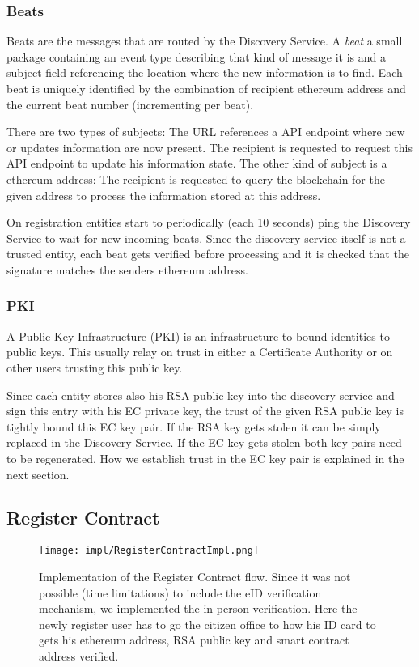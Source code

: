 \subsubsection{Beats}
\label{sec:beats}
Beats are the messages that are routed by the Discovery Service. A \textit{beat} a small package containing an event type describing that kind of message it is and a subject field referencing the location where the new information is to find. Each beat is uniquely identified by the combination of recipient ethereum address and the current beat number (incrementing per beat). 

There are two types of subjects: The URL references a API endpoint where new or updates information are now present. The recipient is requested to request this API endpoint to update his information state. The other kind of subject is a ethereum address: The recipient is requested to query the blockchain for the given address to process the information stored at this address. 

On registration entities start to periodically (each 10 seconds) ping the Discovery Service to wait for new incoming beats. Since the discovery service itself is not a trusted entity, each beat gets verified before processing and it is checked that the signature matches the senders ethereum address.

\subsubsection{PKI}
\label{sec:pki}

A Public-Key-Infrastructure (PKI) is an infrastructure to bound identities to public keys. This usually relay on trust in either a Certificate Authority or on other users trusting this public key. 

Since each entity stores also his RSA public key into the discovery service and sign this entry with his EC private key, the trust of the given RSA public key is tightly bound this EC key pair. If the RSA key gets stolen it can be simply replaced in the Discovery Service. If the EC key gets stolen both key pairs need to be regenerated. How we establish trust in the EC key pair is explained in the next section.

\subsection{Register Contract}
\label{sec:registerContract}
\begin{figure}
\texttt{[image: impl/RegisterContractImpl.png]}
\centering
\caption{Implementation of the Register Contract flow. Since it was not possible (time limitations) to include the eID verification mechanism, we implemented the in-person verification. Here the newly register user has to go the citizen office to how his ID card to gets his ethereum address, RSA public key and smart contract address verified.}
\label{fig:registerContractImpl}
\end{figure}

